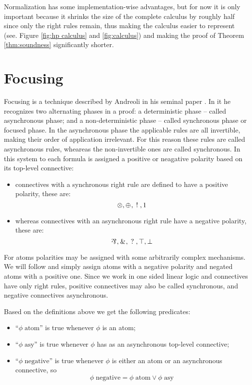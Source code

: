 Normalization has some implementation-wise advantages, but for now it is only important because it shrinks the size of the complete calculus by roughly half since only the right rules remain, thus making the calculus easier to represent (see. Figure \ref{fig:hp calculus} and \ref{fig:calculus}) and making the proof of Theorem \ref{thm:soundness} significantly shorter.

\section{Focusing}
Focusing is a technique described by Andreoli in his seminal paper \cite{Focusing}.
In it he recognizes two alternating phases in a proof: a deterministic phase -- called asynchronous phase; and a non-deterministic phase -- called synchronous phase or focused phase.
In the asynchronous phase the applicable rules are all invertible, making their order of application irrelevant.
For this reason these rules are called asynchronous rules, wheareas the non-invertible ones are called synchronous.
In this system to each formula is assigned a positive or neagative polarity based on its top-level connective:
\begin{itemize}
	\item connectives with a synchronous right rule are defined to have a positive polarity, these are:
		$$ \otimes, {\oplus_{\mathrm{}}}, \;!\;, 1$$
	\item whereas connectives with an asynchronous right rule have a negative polarity, these are:
		$$ \displaypar, \displaywith, \displaywn, \displaytop, \displaybot$$
\end{itemize}
For atoms polarities may be assigned with some arbitrarily complex mechanisms.
We will follow \cite{LiangMiller} and simply assign atoms with a negative polarity and negated atoms with a positive one.
Since we work in one sided linear logic and connectives have only right rules, positive connectives may also be called synchronous, and negative connectives asynchronous.
\begin{define}\label{def:focusing predicates}
	Based on the definitions above we get the following predicates:
	\begin{itemize}
		\item ``$\phi \; \mathrm{atom}$'' is true whenever $\phi$ is an atom;
		\item ``$\phi \; \mathrm{asy}$'' is true whenever $\phi$ has as an asynchronous top-level connective;
		\item ``$\phi \; \mathrm{negative}$'' is true whenever $\phi$ is either an atom or an asynchronous connective, so
			$$ \phi \; \mathrm{negative} = \phi \; \mathrm{atom} \vee \phi \; \mathrm{asy} $$
	\end{itemize}
\end{define}

